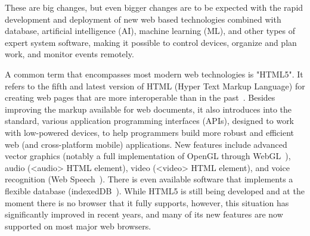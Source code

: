 \documentclass[runningheads,a4paper]{llncs}
\begin{document}
These are big changes, but even bigger changes are to be expected with the rapid development and deployment of new web based technologies combined with database, artificial intelligence (AI), machine learning (ML), and other types of expert system software, making it possible to control devices, organize and plan work, and monitor events remotely.


A common term that encompasses most modern web technologies is "HTML5".  It refers to the fifth and latest version of HTML (Hyper Text Markup Language) for creating web pages that are more interoperable than in the past~\cite{htmlliving}.  Besides improving the markup available for web documents, it also introduces into the standard, various application programming interfaces (APIs), designed to work with low-powered devices, to help programmers build more robust and efficient web (and cross-platform mobile) applications.  New features include advanced vector graphics (notably a full implementation of OpenGL through WebGL~\cite{danchilla2012beginning,rego20153dmol}), audio (<audio> HTML element), video (<video> HTML element), and voice recognition (Web Speech~\cite{adorf2013web}).  There is even available software that implements a flexible database (indexedDB~\cite{collins2012indexed,kimak2015role}).  While HTML5 is still being developed and at the moment there is no browser that it fully supports, however, this situation has significantly improved in recent years, and many of its new features are now supported on most major web browsers.
\end{document}

